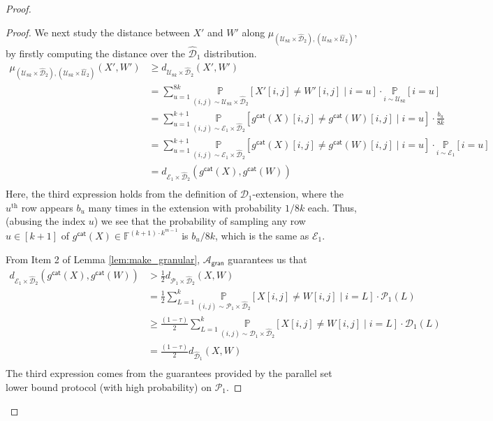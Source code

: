 \documentclass[11pt]{article}
\newcommand{\gran}{\mathsf{gran}}
\newcommand{\F}{\mathbb{F}}
\newcommand{\sU}{\mathcal{U}}
\newcommand{\sD}{\mathcal{D}}
\newcommand{\sA}{\mathcal{A}}
\newcommand{\sP}{\mathcal{P}}
\begin{document}
\begin{proof}
\begin{proof}
    We next study the distance between $X'$ and $W'$ along $\mu_{(\sU_{8k} \times \widehat{\sD}_{2}), (\sU_{8k} \times \widehat{\sU}_{2})}$, by firstly computing the distance over the $\widehat{\sD}_{1}$ distribution. 
    \begin{equation*}
        \begin{split}
            \mu_{(\sU_{8k} \times \widehat{\sD}_{2}), (\sU_{8k} \times \widehat{\sU}_{2})} (X', W') &\geq d_{\sU_{8k} \times \widehat{\sD}_{2}} (X', W') \\
            &= \sum_{u=1}^{8k} \underset{(i,j) \sim \sU_{8k} \times \widehat{\sD}_{2}}{\mathbb{P}} \left[ X'[i,j] \neq W'[i,j] \mid i = u \right] \cdot \underset{i \sim \sU_{8k}}{\mathbb{P}} [i=u]\\
             &= \sum_{u=1}^{k+1} \underset{(i,j) \sim \mathcal{E}_{1} \times \widehat{\sD}_{2}}{\mathbb{P}} \left[ g^{\mathsf{cat}}(X)[i,j] \neq g^{\mathsf{cat}}(W)[i,j] \mid i=u \right] \cdot \frac{b_u}{8k} \\
            &= \sum_{u=1}^{k+1} \underset{(i,j) \sim \mathcal{E}_{1} \times \widehat{\sD}_{2}}{\mathbb{P}} \left[ g^{\mathsf{cat}}(X)[i,j] \neq g^{\mathsf{cat}}(W)[i,j] \mid i=u \right] \cdot \underset{i \sim \mathcal{E}_{1}}{\mathbb{P}} [i=u]\\
            &= d_{\mathcal{E}_{1} \times \widehat{\sD}_{2}} (g^{\mathsf{cat}}(X),g^{\mathsf{cat}}(W))\\
        \end{split}
    \end{equation*}
    Here, the third expression holds from the definition of $\sD_{1}$-extension, where the $u^{\text{th}}$ row appears $b_u$ many times in the extension with probability $1/8k$ each. Thus, (abusing the index $u$) we see that the probability of sampling any row $u \in [k+1]$ of $g^{\mathsf{cat}}(X) \in \F^{(k+1)\cdot k^{m-1}}$ is $b_u/8k$, which is the same as $\mathcal{E}_{1}$.

    From Item 2 of Lemma \ref{lem:make_granular}, $\sA_\gran$ guarantees us that
    \begin{equation*}
        \begin{split}
            d_{\mathcal{E}_{1} \times \widehat{\sD}_{2}} (g^{\mathsf{cat}}(X),g^{\mathsf{cat}}(W)) 
            &> \frac{1}{2} d_{\sP_{1} \times \widehat{\sD}_{2}} (X, W) \\
            &= \frac{1}{2}\sum_{L=1}^k \underset{(i,j) \sim \sP_{1} \times \widehat{\sD}_{2}}{\mathbb{P}} [X[i,j] \neq W[i,j] \mid i = L] \cdot \sP_{1}(L)  \\
            &\geq \frac{(1-\tau)}{2}\sum_{L=1}^k \underset{(i,j) \sim \sD_{1} \times \widehat{\sD}_{2}}{\mathbb{P}} [X[i,j] \neq W[i,j] \mid i = L] \cdot \sD_{1}(L)  \\
            &= \frac{(1-\tau)}{2}d_{\widehat{\sD}_{1}}(X, W) \\
        \end{split}
    \end{equation*}
    The third expression comes from the guarantees provided by the parallel set lower bound protocol (with high probability) on $\sP_{1}$.


\end{proof}
\end{proof}
\end{document}
